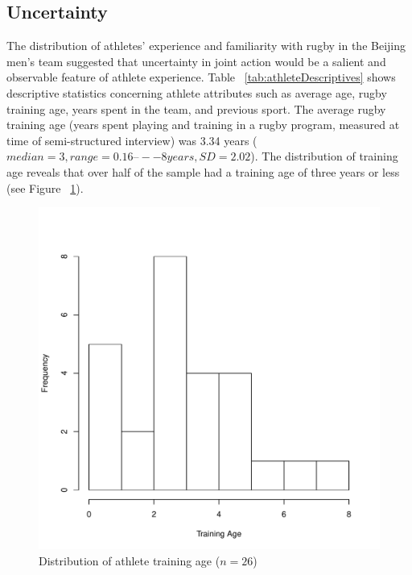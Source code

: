 \begin{CJK}{UTF8}{gbsn}
\section{Uncertainty}
The distribution of athletes' experience and familiarity with rugby in the Beijing men's team suggested that uncertainty in joint action would be a salient and observable feature of athlete experience.  Table ~\ref{tab:athleteDescriptives} shows descriptive statistics concerning athlete attributes such as average age, rugby training age, years spent in the team, and previous sport.  The average rugby training age (years spent playing and training in a rugby program, measured at time of semi-structured interview) was 3.34 years ($median = 3, range = 0.16 –-- 8 years, SD = 2.02$).  The distribution of training age reveals that over half of the sample had a training age of three years or less (see Figure ~\ref{fig:ethnoTrainingAgeHist}).

    \begin{figure}[htbp]
     \begin{center}
     \includegraphics[scale=.3]{images/ethnoTrainingAgeHist.pdf}
       \caption{Distribution of athlete training age ($n = 26$)}
     \end{center}
       \label{fig:ethnoTrainingAgeHist}
    \end{figure}


\end{CJK}
